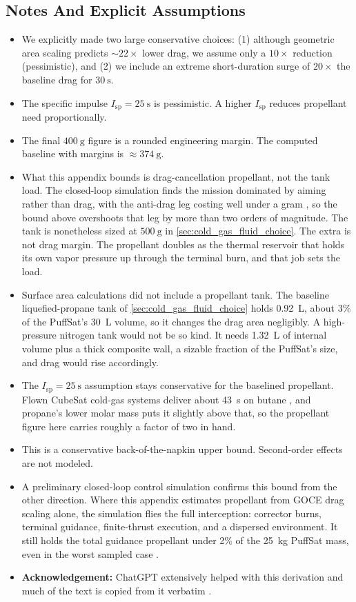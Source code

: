 \documentclass{article}
\begin{document}
\subsection*{Notes And Explicit Assumptions}
\begin{itemize}
  \item We explicitly made two large conservative choices: (1) although geometric area scaling predicts \(\sim22\times\) lower drag, we assume only a \(10\times\) reduction (pessimistic), and (2) we include an extreme short-duration surge of \(20\times\) the baseline drag for \(\SI{30}{\s}\).
  \item The specific impulse \(I_{\mathrm{sp}}=\SI{25}{\s}\) is pessimistic. A higher \(I_{\mathrm{sp}}\) reduces propellant need proportionally.
  \item The final \(\SI{400}{\g}\) figure is a rounded engineering margin. The computed baseline with margins is \(\approx\SI{374}{\g}\).
  \item What this appendix bounds is drag-cancellation propellant, not the tank load. The closed-loop simulation finds the mission dominated by aiming rather than drag, with the anti-drag leg costing well under a gram \cite{Katz_puffsat_control_sim_2026}, so the bound above overshoots that leg by more than two orders of magnitude. The tank is nonetheless sized at \(\SI{500}{\g}\) in \autoref{sec:cold_gas_fluid_choice}. The extra is not drag margin. The propellant doubles as the thermal reservoir that holds its own vapor pressure up through the terminal burn, and that job sets the load.
  \item Surface area calculations did not include a propellant tank. The baseline liquefied-propane tank of \autoref{sec:cold_gas_fluid_choice} holds \SI{0.92}{\liter}, about 3\% of the PuffSat's \SI{30}{\liter} volume, so it changes the drag area negligibly. A high-pressure nitrogen tank would not be so kind. It needs \SI{1.32}{\liter} of internal volume plus a thick composite wall, a sizable fraction of the PuffSat's size, and drag would rise accordingly.
  \item The \(I_{\mathrm{sp}}=\SI{25}{\second}\) assumption stays conservative for the baselined propellant. Flown CubeSat cold-gas systems deliver about \SI{43}{\second} on butane \cite{tummala2017cubesat}, and propane's lower molar mass puts it slightly above that, so the propellant figure here carries roughly a factor of two in hand.
  \item This is a conservative back-of-the-napkin upper bound. Second-order effects are not modeled.
  \item A preliminary closed-loop control simulation confirms this bound from the other direction. Where this appendix estimates propellant from GOCE drag scaling alone, the simulation flies the full interception: corrector burns, terminal guidance, finite-thrust execution, and a dispersed environment. It still holds the total guidance propellant under 2\% of the \SI{25}{\kilo\gram} PuffSat mass, even in the worst sampled case \cite{Katz_puffsat_control_sim_2026}.
  \item \textbf{Acknowledgement:} ChatGPT extensively helped with this derivation and much of the text is copied from it verbatim \cite{chatgpt}.
\end{itemize}
\end{document}
